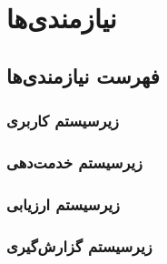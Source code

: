 \chapter{نیازمندی‌ها}



\section{فهرست نیازمندی‌ها}


\subsection{زیرسیستم کاربری}

\subsection{زیرسیستم خدمت‌دهی}

\subsection{زیرسیستم ارزیابی}

\subsection{زیرسیستم گزارش‌گیری}